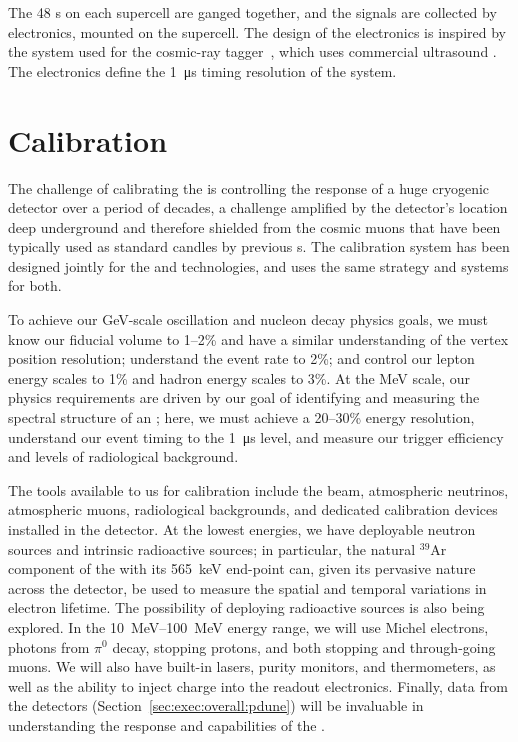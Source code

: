 The 48 s on each  supercell are ganged together, and the signals are collected by  electronics, mounted on the supercell. The design of the   electronics is inspired by the system used for the  cosmic-ray tagger~\cite{bib:mu2e_tdr}, which uses commercial ultrasound . The  electronics define the \SI{1}{\micro\second} timing resolution of the  system.

\section{Calibration}
\label{sec:exec-sp-calibration}

The challenge of calibrating the   is controlling the response of a huge cryogenic detector over a period of decades, a challenge amplified by the detector's location deep underground and therefore shielded from the cosmic muons that have been typically used as standard candles by previous s.  The  calibration system  has been designed jointly for the  and  technologies, and uses the same strategy and systems for both.

To achieve our \si{\giga\electronvolt}-scale oscillation and nucleon decay physics goals, we must know our fiducial volume to 1--2\% and have a similar understanding of the vertex position resolution; understand the \nue event rate to 2\%; and control our lepton energy scales to 1\% and hadron energy scales to 3\%. At the \si{\mega\electronvolt} scale, our physics requirements are driven by our goal of identifying and measuring the spectral structure of an ; here, we must achieve a 20--30\% energy resolution, understand our event timing to the \SI{1}{\micro\second} level, and measure our trigger efficiency and levels of radiological background. 

The tools available to us for calibration include the  beam, atmospheric neutrinos, atmospheric muons, radiological backgrounds, and dedicated calibration devices installed in the detector. At the lowest energies, we have deployable neutron sources and intrinsic radioactive sources; in particular, the natural $^{39}$Ar component of the  with its \SI{565}{\kilo\electronvolt} end-point can, given its pervasive nature across the detector, be used to measure the spatial and temporal variations in electron lifetime. The possibility of deploying radioactive sources is also being explored. In the \SIrange{10}{100}{\mega\electronvolt} energy range, we will use Michel electrons, photons from $\pi^{0}$ decay, stopping protons, and both stopping and through-going muons. We will also have built-in lasers, purity monitors, and thermometers, as well as the ability to inject charge into the readout electronics. Finally, data from the  detectors  (Section~\ref{sec:exec:overall:pdune}) will be invaluable in understanding the response and  capabilities of the .



